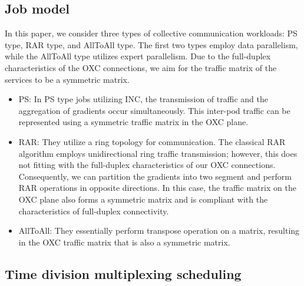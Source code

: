 \documentclass[conference]{IEEEtran}
\begin{document}
\subsection{Job model}

In this paper, we consider three types of collective communication workloads: PS type, RAR type, and AllToAll type. The first two types employ data parallelism, while the AllToAll type utilizes expert parallelism. Due to the full-duplex characteristics of the OXC connections, we aim for the traffic matrix of the services to be a symmetric matrix.

\begin{itemize}
	
	\item PS: In PS type jobs utilizing INC, the transmission of traffic and the aggregation of gradients occur simultaneously. This inter-pod traffic can be represented using a symmetric traffic matrix in the OXC plane.
	
	
	\item RAR: They utilize a ring topology for communication. The classical RAR algorithm employs unidirectional ring traffic transmission; however, this does not fitting with the full-duplex characteristics of our OXC connections. Consequently, we can partition the gradients into two segment and perform RAR operations in opposite directions. In this case, the traffic matrix on the OXC plane also forms a symmetric matrix and is compliant with the characteristics of full-duplex connectivity.
	
	\item AllToAll: They essentially perform transpose operation on a matrix, resulting in the OXC traffic matrix that is also a symmetric matrix.
\end{itemize}

\subsection{Time division multiplexing scheduling}
\end{document}
